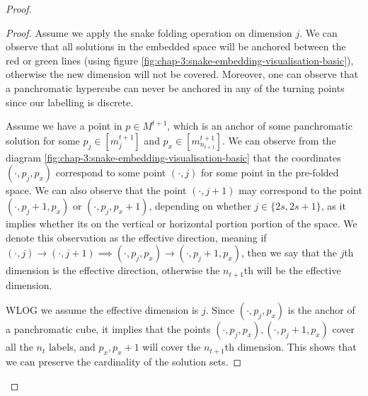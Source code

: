 \begin{proof}
        \begin{proof}
            Assume we apply the snake folding operation on dimension $j$.
            We can observe that all solutions in the embedded space will be anchored between the red or green lines
            (using figure
            \ref{fig:chap-3:snake-embedding-visualisation-basic}), otherwise the new dimension will not be covered.
            Moreover, one can observe that a panchromatic hypercube can never be anchored in any of the turning points since
            our labelling is discrete.


            Assume we have a point
            in $p \in M^{t+1}$, which is an anchor of some panchromatic solution for some $p_j \in [m^{t+1}_j]$ and
            $p_x \in[m^{t+1}_{n_{t+1}}]$. We can observe from the diagram \ref{fig:chap-3:snake-embedding-visualisation-basic}
            that the coordinates $(\cdot, p_j, p_x)$  correspond to some point $(\cdot, j)$ for some point in the pre-folded space.
            We can also observe that the point $(\cdot, j+1)$  may correspond to the point $(\cdot, p_j + 1, p_x)$
            or $(\cdot, p_j, p_x+1)$, depending on whether $j \in \{2s, 2s+1\}$,
            as it implies whether its on the vertical or horizontal portion portion of the space.
            We denote this observation as the effective direction, meaning
            if $(\cdot, j) \to(\cdot, j +1)  \implies (\cdot, p_j, p_x) \to(\cdot, p_j +1, p_x)$,  then we say that the $j$th
            dimension is the effective direction, otherwise the $n_{t+1}$th will
            be the effective dimension.


            WLOG we assume the effective dimension is $j$.
            Since $(\cdot, p_j, p_x)$ is the anchor of a panchromatic cube,
            it implies that the points  $(\cdot, p_j, p_x), (\cdot, p_j +1, p_x)$
            cover all the $n_t$ labels, and $p_x, p_x + 1$ will cover the $n_{t+1}$th dimension.
            This shows that we can preserve the cardinality of the solution sets.


\end{proof}
\end{proof}
